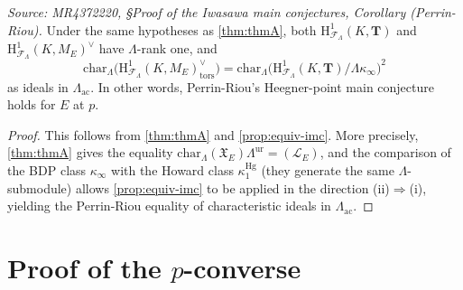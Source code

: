 \begin{corollary}
  \label{cor:PR}
  \textit{Source: MR4372220, \S{}Proof of the Iwasawa main conjectures, Corollary (Perrin-Riou).}
  Under the same hypotheses as \cref{thm:thmA}, both
  $\mathrm{H}^1_{\mathcal{F}_\Lambda}(K, \mathbf{T})$ and
  $\mathrm{H}^1_{\mathcal{F}_\Lambda}(K, M_E)^\vee$ have $\Lambda$-rank one, and
  \[
    \mathrm{char}_\Lambda\!\bigl(\mathrm{H}^1_{\mathcal{F}_\Lambda}(K, M_E)^\vee_{\mathrm{tors}}\bigr)
    = \mathrm{char}_\Lambda\!\bigl(\mathrm{H}^1_{\mathcal{F}_\Lambda}(K, \mathbf{T})/\Lambda\kappa_\infty\bigr)^2
  \]
  as ideals in $\Lambda_{\mathrm{ac}}$.
  In other words, Perrin-Riou's Heegner-point main conjecture holds for $E$ at $p$.
\end{corollary}

\begin{proof}
  This follows from \cref{thm:thmA} and \cref{prop:equiv-imc}.
  More precisely, \cref{thm:thmA} gives the equality
  $\mathrm{char}_\Lambda(\mathfrak{X}_E)\Lambda^{\mathrm{ur}} = (\mathcal{L}_E)$,
  and the comparison of the BDP class $\kappa_\infty$ with the Howard class
  $\kappa_1^{\mathrm{Hg}}$ (they generate the same $\Lambda$-submodule) allows
  \cref{prop:equiv-imc} to be applied in the direction (ii)$\Rightarrow$(i),
  yielding the Perrin-Riou equality of characteristic ideals in $\Lambda_{\mathrm{ac}}$.
\end{proof}

\section{Proof of the \texorpdfstring{$p$}{p}-converse}

